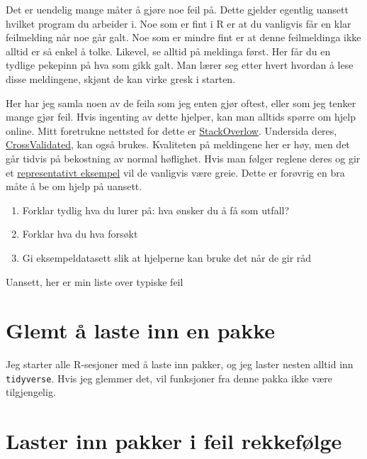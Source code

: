 \documentclass[
  letterpaper,
  DIV=11,
  numbers=noendperiod]{scrreprt}
\providecommand{\tightlist}{%
  \setlength{\itemsep}{0pt}\setlength{\parskip}{0pt}}\usepackage{longtable,booktabs,array}
\begin{document}
Det er uendelig mange måter å gjøre noe feil på. Dette gjelder egentlig
uansett hvilket program du arbeider i. Noe som er fint i R er at du
vanligvis får en klar feilmelding når noe går galt. Noe som er mindre
fint er at denne feilmeldinga ikke alltid er så enkel å tolke. Likevel,
se alltid på meldinga først. Her får du en tydlige pekepinn på hva som
gikk galt. Man lærer seg etter hvert hvordan å lese disse meldingene,
skjønt de kan virke gresk i starten.

Her har jeg samla noen av de feila som jeg enten gjør oftest, eller som
jeg tenker mange gjør feil. Hvis ingenting av dette hjelper, kan man
alltids spørre om hjelp online. Mitt foretrukne nettsted for dette er
\href{https://stackoverflow.com/}{StackOverlow}. Undersida deres,
\href{https://stats.stackexchange.com/}{CrossValidated}, kan også
brukes. Kvaliteten på meldingene her er høy, men det går tidvis på
bekostning av normal høflighet. Hvis man følger reglene deres og gir et
\href{https://reprex.tidyverse.org/}{representativt eksempel} vil de
vanligvis være greie. Dette er forøvrig en bra måte å be om hjelp på
uansett.

\begin{enumerate}
\def\labelenumi{\arabic{enumi}.}
\tightlist
\item
  Forklar tydlig hva du lurer på: hva ønsker du å få som utfall?
\item
  Forklar hva du hva forsøkt
\item
  Gi eksempeldatasett slik at hjelperne kan bruke det når de gir råd
\end{enumerate}

Uansett, her er min liste over typiske feil

\hypertarget{glemt-uxe5-laste-inn-en-pakke}{%
\section{Glemt å laste inn en
pakke}\label{glemt-uxe5-laste-inn-en-pakke}}

Jeg starter alle R-sesjoner med å laste inn pakker, og jeg laster nesten
alltid inn \texttt{tidyverse}. Hvis jeg glemmer det, vil funksjoner fra
denne pakka ikke være tilgjengelig.

\hypertarget{laster-inn-pakker-i-feil-rekkefuxf8lge}{%
\section{Laster inn pakker i feil
rekkefølge}\label{laster-inn-pakker-i-feil-rekkefuxf8lge}}
\end{document}
